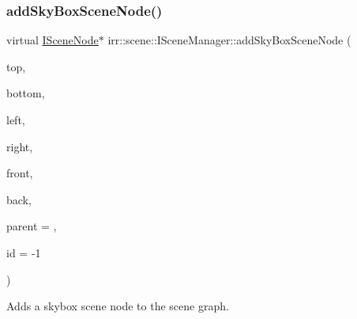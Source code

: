 \subsubsection{\texorpdfstring{add\+Sky\+Box\+Scene\+Node()}{addSkyBoxSceneNode()}\hspace{0.1cm}{\footnotesize\ttfamily [2/2]}}
{\footnotesize\ttfamily virtual \hyperlink{classirr_1_1scene_1_1ISceneNode}{I\+Scene\+Node}$\ast$ irr\+::scene\+::\+I\+Scene\+Manager\+::add\+Sky\+Box\+Scene\+Node (\begin{DoxyParamCaption}\item[{\hyperlink{classirr_1_1video_1_1ITexture}{video\+::\+I\+Texture} $\ast$}]{top,  }\item[{\hyperlink{classirr_1_1video_1_1ITexture}{video\+::\+I\+Texture} $\ast$}]{bottom,  }\item[{\hyperlink{classirr_1_1video_1_1ITexture}{video\+::\+I\+Texture} $\ast$}]{left,  }\item[{\hyperlink{classirr_1_1video_1_1ITexture}{video\+::\+I\+Texture} $\ast$}]{right,  }\item[{\hyperlink{classirr_1_1video_1_1ITexture}{video\+::\+I\+Texture} $\ast$}]{front,  }\item[{\hyperlink{classirr_1_1video_1_1ITexture}{video\+::\+I\+Texture} $\ast$}]{back,  }\item[{\hyperlink{classirr_1_1scene_1_1ISceneNode}{I\+Scene\+Node} $\ast$}]{parent = {},  }\item[{\hyperlink{namespaceirr_ac66849b7a6ed16e30ebede579f9b47c6}{s32}}]{id = {\ttfamily -\/1} }\end{DoxyParamCaption})\hspace{0.3cm}{\ttfamily [pure virtual]}}



Adds a skybox scene node to the scene graph. 

